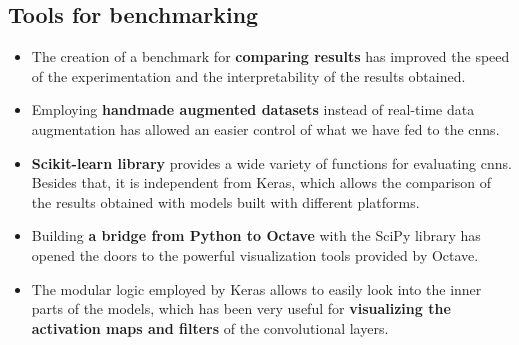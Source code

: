 \subsection*{Tools for benchmarking}
\begin{itemize}
	\item The creation of a benchmark for \textbf{comparing results} has improved the speed of the experimentation and the interpretability of the results obtained.
	\item Employing \textbf{handmade augmented datasets} instead of real-time data augmentation has allowed an easier control of what we have fed to the \glspl{cnn}.
	\item \textbf{Scikit-learn library} provides a wide variety of functions for evaluating \glspl{cnn}. Besides that, it is independent from Keras, which allows the comparison of the results obtained with models built with different platforms. 
	\item Building \textbf{a bridge from Python to Octave} with the SciPy library has opened the doors to the powerful visualization tools provided by Octave.
	\item The modular logic employed by Keras allows to easily look into the inner parts of the models, which has been very useful for \textbf{visualizing the activation maps and filters} of the convolutional layers.
\end{itemize}

